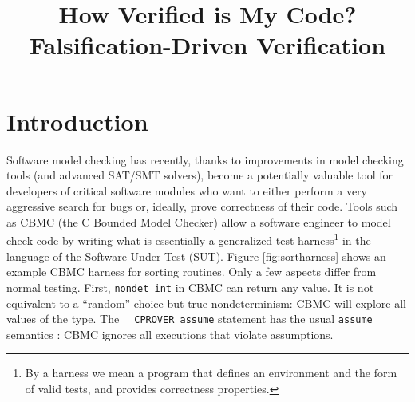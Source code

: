 \documentclass[conference]{IEEEtran}
\begin{document}
\title{How Verified is My Code?\\Falsification-Driven Verification}

\author{
\and
{}
}


\maketitle


\begin{abstract}

\end{abstract}

\IEEEpeerreviewmaketitle



\section{Introduction}

Software model checking \cite{ModelChecking} has recently, thanks to
improvements in model checking tools (and advanced SAT/SMT solvers), become
a potentially valuable tool for developers of critical software
modules who want to either perform a very aggressive search for
bugs or, ideally, prove correctness of their code.  Tools such as
CBMC \cite{CBMCp} (the C Bounded Model Checker) allow a software
engineer to model check code by writing what is essentially a
generalized test harness\footnote{By a harness we mean a program that
  defines an environment and the form of valid tests, and provides
  correctness properties.} in the language of the Software Under Test
(SUT).  Figure \ref{fig:sortharness} shows an example CBMC harness for
sorting routines.  Only a few aspects differ from normal testing.
First, {\tt nondet\_int} in CBMC can return any value.  It is
not equivalent to a ``random'' choice but true nondeterminism: CBMC
will explore all values of the type.  The {\tt \_\_CPROVER\_assume}
statement has the usual
{\tt assume} semantics \cite{EWD:Discipline,exploit}: CBMC ignores
all executions that violate assumptions.
\end{document}
